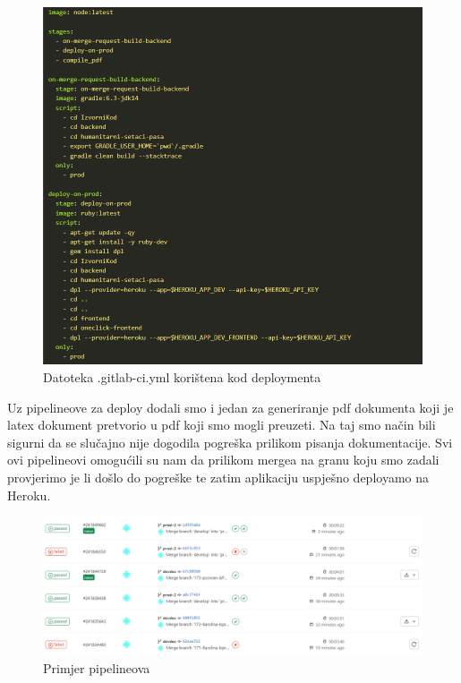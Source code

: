 \begin{figure}[H]
	\includegraphics[width=\linewidth]{slike/heroku-cicd.png}
	\centering
	\caption{Datoteka .gitlab-ci.yml korištena kod deploymenta}
	\label{fig:gitlabci}
\end{figure}
Uz pipelineove za deploy dodali smo i jedan za generiranje pdf dokumenta koji je latex dokument pretvorio u pdf koji smo mogli preuzeti. Na taj smo način bili sigurni da se slučajno nije dogodila pogreška prilikom pisanja dokumentacije.
Svi ovi pipelineovi omogućili su nam da prilikom mergea na granu koju smo zadali provjerimo je li došlo do pogreške te zatim aplikaciju uspješno deployamo na Heroku.
\begin{figure}[H]
	\includegraphics[width=\linewidth]{slike/heroku-pipelines.png}
	\centering
	\caption{Primjer pipelineova}
	\label{fig:pipelines}
\end{figure}